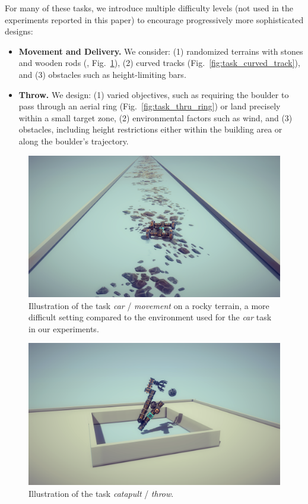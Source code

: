 For many of these tasks, we introduce multiple difficulty levels (not used in the experiments reported in this paper) to encourage progressively more sophisticated designs:

\begin{itemize}
    \item \textbf{Movement and Delivery.}
We consider: (1) randomized terrains with stones and wooden rods (\eg, Fig.~\ref{fig:task_movement_rocky}), (2) curved tracks (Fig.~\ref{fig:task_curved_track}), and (3) obstacles such as height-limiting bars.

    \item \textbf{Throw.}
We design: (1) varied objectives, such as requiring the boulder to pass through an aerial ring (Fig.~\ref{fig:task_thru_ring}) or land precisely within a small target zone, (2) environmental factors such as wind, and (3) obstacles, including height restrictions either within the building area or along the boulder’s trajectory.

\end{itemize}


\begin{figure}[h!]
  \centering
  \includegraphics[width=\linewidth]{figures/tasks/movement_rocky.png}
  \caption{\footnotesize Illustration of the task \textit{car} / \textit{movement} on a rocky terrain, a more difficult setting compared to the environment used for the \textit{car} task in our experiments.}
  \label{fig:task_movement_rocky}
\end{figure}


\begin{figure}[h!]
  \centering
  \includegraphics[width=\linewidth]{figures/tasks/throw.png}
  \caption{\footnotesize Illustration of the task \textit{catapult} / \textit{throw}.}
  \label{fig:task_throw}
\end{figure}


